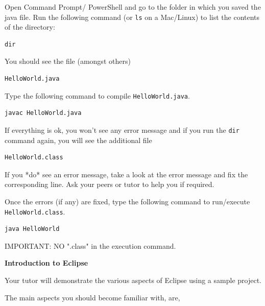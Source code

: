 \begin{questions}
Open Command Prompt/ PowerShell and go to the folder in which you saved the java file. Run the following command (or \texttt{ls} on a Mac/Linux) to list the contents of the directory:

\begin{lstlisting}[numbers=none]
dir
\end{lstlisting}

You should see the file (amongst others)

\begin{lstlisting}[numbers=none]
HelloWorld.java
\end{lstlisting}

Type the following command to compile \texttt{HelloWorld.java}. 

\begin{lstlisting}[numbers=none]
javac HelloWorld.java	
\end{lstlisting}

If everything is ok, you won't see any error message and if you run the \texttt{dir} command again, you will see the additional file

\begin{lstlisting}[numbers=none]
HelloWorld.class
\end{lstlisting}

If you *do* see an error message, take a look at the error message and fix the corresponding line. Ask your peers or tutor to help you if required.

Once the errors (if any) are fixed, type the following command to run/execute \texttt{HelloWorld.class}. 

\begin{lstlisting}[numbers=none]
java HelloWorld
\end{lstlisting}

IMPORTANT: NO ".class" in the execution command.

\question \textbf{Introduction to Eclipse}

Your tutor will demonstrate the various aspects of Eclipse using a sample project.

The main aspects you should become familiar with, are,


\end{questions}
